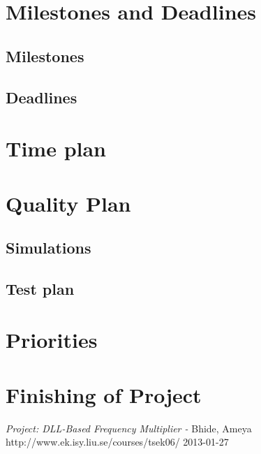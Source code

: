 \documentclass[a4paper,12pt]{article}
\begin{document}
\section{Milestones and Deadlines}
\subsection{Milestones}
\subsection{Deadlines}

\section{Time plan}

\section{Quality Plan}
\subsection{Simulations}
\subsection{Test plan}

\section{Priorities}

\section{Finishing of Project}

\newpage
\appendix

\newpage


\begin{thebibliography}{99}
\textit{Project: DLL-Based Frequency Multiplier - } Bhide, Ameya
\\ http://www.ek.isy.liu.se/courses/tsek06/ 2013-01-27
\end{thebibliography}
\end{document}
